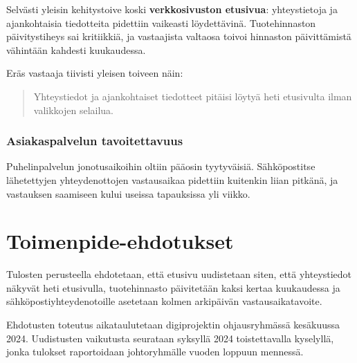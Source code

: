 \documentclass{sfs-2487-2024}
\begin{document}
Selvästi yleisin kehitystoive koski \textbf{verkkosivuston etusivua}:
yhteystietoja ja ajankohtaisia tiedotteita pidettiin vaikeasti
löydettävinä. Tuotehinnaston päivitystiheys sai kritiikkiä, ja
vastaajista valtaosa toivoi hinnaston päivittämistä vähintään
kahdesti kuukaudessa.

Eräs vastaaja tiivisti yleisen toiveen näin:

\begin{quote}
Yhteystiedot ja ajankohtaiset tiedotteet pitäisi löytyä heti
etusivulta ilman valikkojen selailua.
\end{quote}

\subsubsection{Asiakaspalvelun tavoitettavuus}

Puhelinpalvelun jonotusaikoihin oltiin pääosin tyytyväisiä.
Sähköpostitse lähetettyjen yhteydenottojen vastausaikaa pidettiin
kuitenkin liian pitkänä, ja vastauksen saamiseen kului useissa
tapauksissa yli viikko.

\section{Toimenpide-ehdotukset}

Tulosten perusteella ehdotetaan, että etusivu uudistetaan siten,
että yhteystiedot näkyvät heti etusivulla, tuotehinnasto päivitetään
kaksi kertaa kuukaudessa ja sähköpostiyhteydenotoille asetetaan
kolmen arkipäivän vastausaikatavoite.

Ehdotusten toteutus aikataulutetaan digiprojektin ohjausryhmässä
kesäkuussa 2024. Uudistusten vaikutusta seurataan syksyllä 2024
toistettavalla kyselyllä, jonka tulokset raportoidaan johtoryhmälle
vuoden loppuun mennessä.




\makecontactinfo
\end{document}
